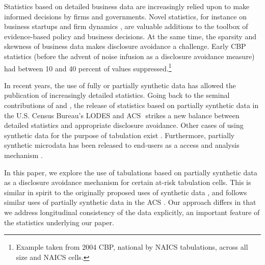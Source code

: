 
Statistics based on detailed business data are increasingly relied upon to make informed 
decisions by firms and governments. Novel statistics, for instance on business startups and firm 
dynamics \cite{BDS2}, are valuable additions to the toolbox of evidence-based policy and 
business decisions. At the same time, the sparsity and skewness of business data makes 
disclosure avoidance a challenge. Early \ac{CBP} statistics (before the advent of noise infusion as 
a disclosure avoidance measure) had between 10 and 40 percent of values suppressed.\footnote{Example taken from 2004 CBP, national by NAICS tabulations, across all size and NAICS cells.} 

In recent years, the use of fully or partially synthetic data has allowed the publication of 
increasingly detailed statistics. Going back to the seminal contributions of \cite{rubin93} and 
\cite{little93}, the release of statistics based on partially synthetic data in the U.S. Census 
Bureau's \ac{LODES} \cite{Ashwin2008} and \ac{ACS} 
\cite{Rodriguez2007,hawala2008,zayatzjsm2009}⁠ strikes a 
new 
balance between detailed statistics and appropriate disclosure avoidance. Other cases of using 
synthetic data for the purpose of tabulation exist
\cite{AbowdEtAl2012,RePEc:cen:wpaper:13-19}.
  Furthermore, partially 
synthetic microdata \cite{Drechsler2012,KinneyEtAl2011,ssafinal} has been released to 
end-users as a access and analysis mechanism \cite{CES-WP-2014-10}.

In this paper, we explore the use of tabulations based on partially synthetic data as a disclosure 
avoidance mechanism for certain at-risk tabulation cells. This is similar in spirit to the originally 
proposed uses of synthetic data \cite{little93,rubin93}, and follows similar uses of  
partially synthetic data in the \ac{ACS} \cite{hawala2008,zayatzjsm2009}⁠. Our approach differs in 
that we address longitudinal consistency of the data explicitly, an important feature of the 
statistics underlying our paper. 

